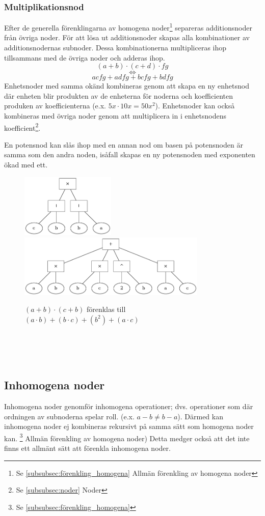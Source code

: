\documentclass[12pt,a4paper]{article}
\begin{document}
\subsubsection{Multiplikationsnod}
Efter de generella förenklingarna av homogena noder\footnote{Se \ref{subsubsec:förenkling_homogena} Allmän förenkling av homogena noder} separeras additionsnoder från övriga noder. För att lösa ut additionsnoder skapas alla kombinationer av additionsnodernas subnoder. Dessa kombinationerna multipliceras ihop tillsammans med de övriga noder och adderas ihop.
\[ \left( a+b \right) \cdot \left( c+d \right) \cdot fg \]
\[ \Leftrightarrow \]
\[ acfg + adfg + bcfg+bdfg \]
Enhetsnoder med samma okänd kombineras genom att skapa en ny enhetsnod där enheten blir produkten av de enheterna för noderna och koefficienten produken av koefficienterna (e.x. \(5x \cdot 10x = 50x^{2}\)). Enhetsnoder kan också kombineras med övriga noder genom att multiplicera in i enhetsnodens koefficient\footnote{Se \ref{subsubsec:noder} Noder}.\par
En potensnod kan slås ihop med en annan nod om basen på potensnoden är samma som den andra noden, isåfall skapas en ny potensnoden med exponenten ökad med ett.
\begin{figure}[h!]
  \centering
  \includegraphics[width=0.4\textwidth]{image26}
  \includegraphics[width=0.8\textwidth]{image32}
  \caption{\((a + b) \cdot (c + b)\) förenklas till \((a \cdot b) + (b \cdot c) + (b ^ 2) + (a \cdot c)\)}
\end{figure}
\\
\\
\\
\subsection{Inhomogena noder}
\label{subsec:inhomogena_noder}
Inhomogena noder genomför inhomogena operationer; dvs. operationer som där ordningen av subnoderna spelar roll. (e.x. \(a - b \neq b - a\)). Därmed kan inhomogena noder ej kombineras rekursivt på samma sätt som homogena noder kan. \footnote{Se \ref{subsubsec:förenkling_homogena}} Allmän förenkling av homogena noder) Detta medger också att det inte finns ett allmänt sätt att förenkla inhomogena noder.
\end{document}
